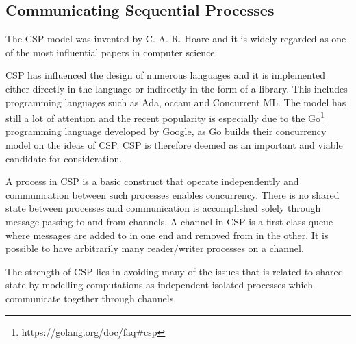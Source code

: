 \subsection{Communicating Sequential Processes}
The \ac{CSP} model was invented by C. A. R. Hoare and it is widely regarded as one of the most influential papers in computer science\cite{abdallah2005communicating}. 

\ac{CSP} has influenced the design of numerous languages and it is implemented either directly in the language or indirectly in the form of a library. This includes programming languages such as Ada, occam and Concurrent ML\cite{abdallah2005communicating}. The model has still a lot of attention and the recent popularity is especially due to the Go\footnote{https://golang.org/doc/faq\#csp} programming language developed by Google, as Go builds their concurrency model on the ideas of \ac{CSP}\cite[Chap. 6]{sevenModels}. \ac{CSP} is therefore deemed as an important and viable candidate for consideration.

A process in \ac{CSP} is a basic construct that operate independently and communication between such processes enables concurrency\cite{ibmCSP}. There is no shared state between processes and communication is accomplished solely through message passing to and from channels. A channel in \ac{CSP} is a first-class queue where messages are added to in one end and removed from in the other\cite[Chap. 6]{sevenModels}. It is possible to have arbitrarily many reader/writer processes on a channel. 

The strength of \ac{CSP} lies in avoiding many of the issues that is related to shared state by modelling computations as independent isolated processes which communicate together through channels. 


